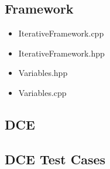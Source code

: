 \subsection{Framework}

\begin{itemize}
   \item IterativeFramework.cpp

   {\tiny }
   
   \item IterativeFramework.hpp
   
   {\tiny }
   
   \item Variables.hpp
   
   {\tiny }
   
   \item Variables.cpp
   
   {\tiny }
   
\end{itemize}

\subsection{DCE}

{\tiny }

\subsection{DCE Test Cases}


